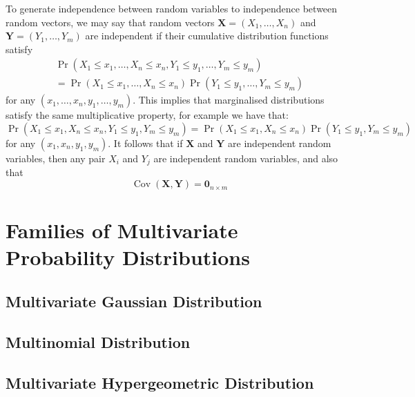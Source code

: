 \documentclass[11pt]{report} %
\begin{document}
To generate independence between random variables to independence between random vectors, we may say that random vectors $\mathbf{X} = \left(X_{1}, \dots, X_{n}\right)$ and $\mathbf{Y} = \left(Y_{1}, \dots, Y_{m}\right)$ are independent if their cumulative distribution functions satisfy
\begin{multline}
\operatorname{Pr}\left(X_{1} \leq x_{1}, \dots, X_{n} \leq x_{n}, Y_{1} \leq y_{1}, \dots, Y_{m} \leq y_{m}\right) \\
= \operatorname{Pr}\left(X_{1} \leq x_{1}, \dots, X_{n} \leq x_{n}\right)\operatorname{Pr}\left(Y_{1} \leq y_{1}, \dots, Y_{m} \leq y_{m}\right)
\end{multline}
for any $\left(x_{1}, \dots, x_{n}, y_{1}, \dots, y_{m}\right)$. This implies that marginalised distributions satisfy the same multiplicative property, for example we have that:
\begin{equation}
\operatorname{Pr}\left(X_{1} \leq x_{1}, X_{n} \leq x_{n}, Y_{1} \leq y_{1}, Y_{m} \leq y_{m}\right) = \operatorname{Pr}\left(X_{1} \leq x_{1}, X_{n} \leq x_{n}\right)\operatorname{Pr}\left(Y_{1} \leq y_{1}, Y_{m} \leq y_{m}\right)
\end{equation}
for any $\left(x_{1}, x_{n}, y_{1}, y_{m}\right)$. It follows that if $\mathbf{X}$ and $\mathbf{Y}$ are independent random variables, then any pair $X_{i}$ and $Y_{j}$ are independent random variables, and also that
\begin{equation}
\operatorname{Cov}\left(\mathbf{X}, \mathbf{Y}\right) = \mathbf{0}_{n \times m}
\end{equation}

\section{Families of Multivariate Probability Distributions}

\subsection{Multivariate Gaussian Distribution}

\subsection{Multinomial Distribution}

\subsection{Multivariate Hypergeometric Distribution}
\end{document}
